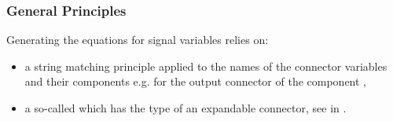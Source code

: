 \documentclass[letterpaper,10pt, openany,english]{sphinxmanual}
\begin{document}
\subsubsection{General Principles}
\label{\detokenize{requirements:general-principles}}
Generating the  equations for signal variables relies on:
\begin{itemize}
\item {} 
a string matching principle applied to the names of the connector variables and their components e.g.  for the output connector  of the component ,

\item {} 
a so-called  which has the type of an expandable connector, see  in .

\end{itemize}
\end{document}

